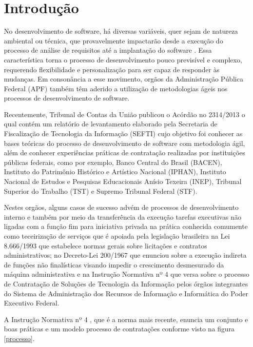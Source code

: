 \section{Introdução}
\label{intro}

No desenvolvimento de software, há diversas variáveis, quer sejam de natureza ambiental ou técnica, que provavelmente impactarão desde a execução do processo de análise de requisitos até a implantação do software \cite{beckarticle1999}. Essa característica torna o processo de desenvolvimento pouco previsível e complexo, requerendo flexibilidade e personalização para ser capaz de responder às mudanças. 
Em consonância a esse movimento, orgãos da Administração Pública Federal (APF) também têm aderido a utilização de metodologias ágeis nos processos de desenvolvimento de software.

Recentemente, Tribunal de Contas da União publicou o Acórdão no 2314/2013 \cite{TCU:2013}
o qual contém um relatório de levantamento elaborado pela Secretaria de Fiscalização
de Tecnologia da Informação (SEFTI) cujo objetivo foi conhecer as bases teóricas do
processo de desenvolvimento de software com metodologia ágil, além de conhecer experiências práticas de contratação realizadas por instituições públicas federais, como por exemplo, Banco Central do Brasil (BACEN), Instituto do Patrimônio Histórico e Artístico Nacional (IPHAN), Instituto Nacional de Estudos e Pesquisas Educacionais Anísio Texeira (INEP), Tribunal Superior do Trabalho (TST) e Supremo Tribunal Federal (STF).

Nestes orgãos, alguns casos de sucesso advém de processos de desenvolvimento interno e também por meio da transferência da execução tarefas executivas não ligadas com a função fim para iniciativa privada na prática conhecida comumente como teceirização de serviços que é apoiada pela legislação brasileira na Lei 8.666/1993 \cite{Lei8666:1993} que estabelece normas gerais sobre licitações e contratos administrativos; no Decreto-Lei 200/1967 que enunciou sobre a execução indireta de funções não finalísticas visando impedir o crescimento desmesurado da máquina administrativa e na Instrução Normativa nº 4 \cite{IN04:2010} que versa sobre o processo de Contratação de Soluções de Tecnologia da Informação pelos órgãos integrantes do Sistema de Administração dos Recursos de Informação e Informática do Poder Executivo Federal.

A Instrução Normativa nº 4 \cite{IN04:2010}, que é a norma mais recente, enuncia um conjunto e boas práticas e um modelo processo de contratações conforme visto na figura \ref{processo}. 

